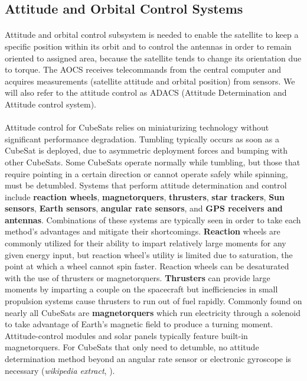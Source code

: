 \subsection{Attitude and Orbital Control Systems}

\paragraph{}Attitude and orbital control subsystem is needed to enable the satellite to keep a specific position within its orbit and to control the antennas in order to remain oriented to assigned area, because the satellite tends to change its orientation due to torque. The AOCS receives telecommands from the central computer and acquires measurements (satellite attitude and orbital position) from sensors. We will also refer to the attitude control as ADACS (Attitude Determination and Attitude control system).

\paragraph{} Attitude control for CubeSats relies on miniaturizing technology without significant performance degradation. Tumbling typically occurs as soon as a CubeSat is deployed, due to asymmetric deployment forces and bumping with other CubeSats. Some CubeSats operate normally while tumbling, but those that require pointing in a certain direction or cannot operate safely while spinning, must be detumbled. Systems that perform attitude determination and control include \textbf{reaction wheels}, \textbf{magnetorquers}, \textbf{thrusters}, \textbf{star trackers}, \textbf{Sun sensors}, \textbf{Earth sensors}, \textbf{angular rate sensors}, and \textbf{GPS receivers and antennas}. Combinations of these systems are typically seen in order to take each method's advantages and mitigate their shortcomings. \textbf{Reaction} wheels are commonly utilized for their ability to impart relatively large moments for any given energy input, but reaction wheel's utility is limited due to saturation, the point at which a wheel cannot spin faster. Reaction wheels can be desaturated with the use of thrusters or magnetorquers. \textbf{Thrusters} can provide large moments by imparting a couple on the spacecraft but inefficiencies in small propulsion systems cause thrusters to run out of fuel rapidly. Commonly found on nearly all CubeSats are \textbf{magnetorquers} which run electricity through a solenoid to take advantage of Earth's magnetic field to produce a turning moment. Attitude-control modules and solar panels typically feature built-in magnetorquers. For CubeSats that only need to detumble, no attitude determination method beyond an angular rate sensor or electronic gyroscope is necessary (\textit{wikipedia extract}, \cite{Macdonald2014}). 

